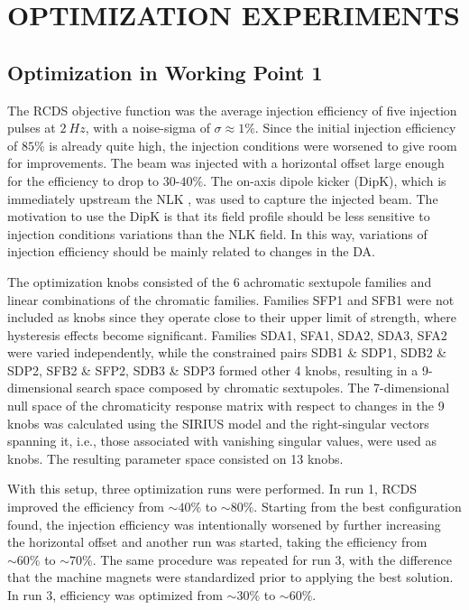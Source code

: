 \documentclass[a4paper,
               keeplastbox,   %
               ]{jacow}
\begin{document}
\section{OPTIMIZATION EXPERIMENTS}

\subsection{Optimization in Working Point 1}
The RCDS objective function was the average injection efficiency of five injection pulses at $2~\unit{Hz}$, with a noise-sigma of $\sigma \approx 1\%$. Since the initial injection efficiency of $85\%$ is already quite high, the injection conditions were worsened to give room for improvements. The beam was injected with a horizontal offset large enough for the efficiency to drop to $30$-$40\%$. The on-axis dipole kicker (DipK), which is immediately upstream the NLK \cite{Liu:IPAC2016-THPMR011}, was used to capture the injected beam. The motivation to use the DipK is that its field profile should be less sensitive to injection conditions variations than the NLK field. In this way, variations of injection efficiency should be mainly related to changes in the DA.

The optimization knobs consisted of the 6 achromatic sextupole families and linear combinations of the chromatic families. Families SFP1 and SFB1 were not included as knobs since they operate close to their upper limit of strength, where hysteresis effects become significant.  Families SDA1, SFA1, SDA2, SDA3, SFA2 were varied independently, while the constrained pairs SDB1 \& SDP1, SDB2 \& SDP2, SFB2 \& SFP2, SDB3 \& SDP3 formed other 4 knobs, resulting in a 9-dimensional search space composed by chromatic sextupoles. The 7-dimensional null space of the chromaticity response matrix with respect to changes in the 9 knobs was calculated using the SIRIUS model and the right-singular vectors spanning it, i.e., those associated with vanishing singular values, were used as knobs. The resulting parameter space consisted on 13 knobs. 

With this setup, three optimization runs were performed. In run 1, RCDS improved the efficiency from $\sim40\%$ to $\sim80\%$. Starting from the best configuration found, the injection efficiency was intentionally worsened by further increasing the horizontal offset and another run was started, taking the efficiency from $\sim60\%$ to $\sim70\%$. The same procedure was repeated for run 3, with the difference that the machine magnets were standardized prior to applying the best solution. In run 3, efficiency was optimized from $\sim30\%$ to $\sim60\%$.
 
\end{document}

